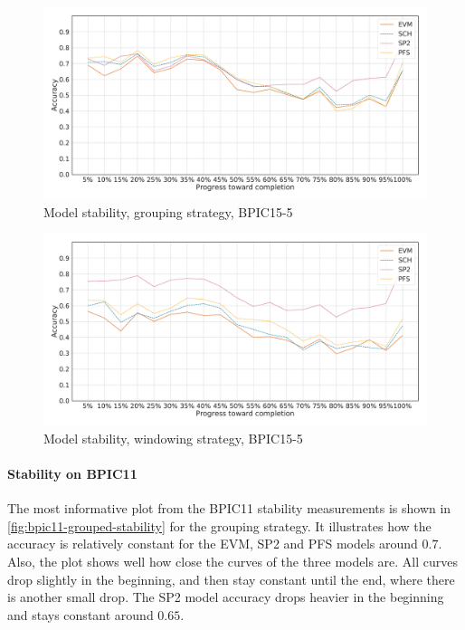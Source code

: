 \begin{figure}[!htb]
    \centering
    \includegraphics[width=\textwidth]{gfx/bpic2015_5/grouped_stability.pdf}
    \caption{Model stability, grouping strategy, BPIC15-5}
    \label{fig:bpic15-5-grouped-stability}
\end{figure}
\begin{figure}[!htb]
    \centering
    \includegraphics[width=\textwidth]{gfx/bpic2015_5/windowed_stability.pdf}
    \caption{Model stability, windowing strategy, BPIC15-5}
    \label{fig:bpic15-5-windowed-stability}
\end{figure}
\newpage

\paragraph{Stability on BPIC11}
The most informative plot from the BPIC11 stability measurements is shown in \autoref{fig:bpic11-grouped-stability} for the grouping strategy.
It illustrates how the accuracy is relatively constant for the EVM, SP2 and PFS models around $0.7$.
Also, the plot shows well how close the curves of the three models are.
All curves drop slightly in the beginning, and then stay constant until the end, where there is another small drop.
The SP2 model accuracy drops heavier in the beginning and stays constant around $0.65$.

